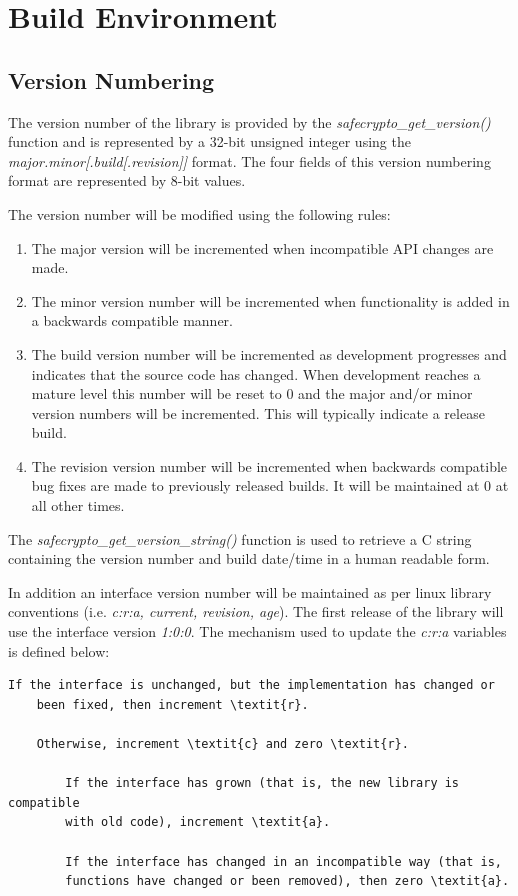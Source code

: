 \chapter{Build Environment}

\section{Version Numbering}

The version number of the library is provided by the \textit{safecrypto\_get\_version()} function and is represented by a 32-bit unsigned integer using the \textit{major.minor[.build[.revision]]} format. The four fields of this version numbering format are represented by 8-bit values.

\noindent The version number will be modified using the following rules:

\begin{enumerate}
\item The major version will be incremented when incompatible API changes are made.
\item The minor version number will be incremented when functionality is added in a backwards compatible manner.
\item The build version number will be incremented as development progresses and indicates that the source code has changed. When development reaches a mature level this number will be reset to $0$ and the major and/or minor version numbers will be incremented. This will typically indicate a release build.
\item The revision version number will be incremented when backwards compatible bug fixes are made to previously released builds. It will be maintained at $0$ at all other times.
\end{enumerate}

The \textit{safecrypto\_get\_version\_string()} function is used to retrieve a C string containing the version number and build date/time in a human readable form.

In addition an interface version number will be maintained as per linux library conventions (i.e. \textit{c:r:a, current, revision, age}). The first release of the library will use the interface version \textit{1:0:0}. The mechanism used to update the \textit{c:r:a} variables is defined below:

\begin{Verbatim}[commandchars=\\\{\},codes={\catcode`$=3\catcode`_=8}]
    If the interface is unchanged, but the implementation has changed or
    been fixed, then increment \textit{r}.

    Otherwise, increment \textit{c} and zero \textit{r}.

        If the interface has grown (that is, the new library is compatible
        with old code), increment \textit{a}.

        If the interface has changed in an incompatible way (that is, 
        functions have changed or been removed), then zero \textit{a}.
\end{Verbatim}


